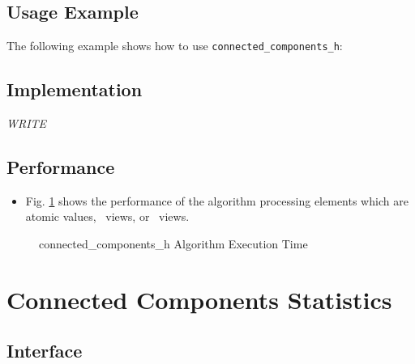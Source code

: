 \subsection{Usage Example} \label{sec-conn-comp-hmach-hubs-alg-use}

The following example shows how to use 
\texttt{connected\_components\_h}:


\subsection{Implementation} \label{sec-conn-comp-hmach-hubs-alg-impl}

\textit{WRITE}

\subsection{Performance} \label{sec-conn-compmach-hubs-h-alg-perf}

\begin{itemize}
\item
Fig. \ref{fig:conn-comp-hmach-hubs-alg-exec-exper}
shows the performance of the algorithm processing
elements which are atomic values, \stl\ views, or \stapl\ views.
\end{itemize}

\begin{figure}[p]
\caption{connected\_components\_h Algorithm Execution Time}
\label{fig:conn-comp-hmach-hubs-alg-exec-exper}
\end{figure}


\section{ Connected Components Statistics}
\label{sec-conn-comp-stats-alg}

\subsection{Interface} \label{sec-conn-comp-stats-alg-inter}

